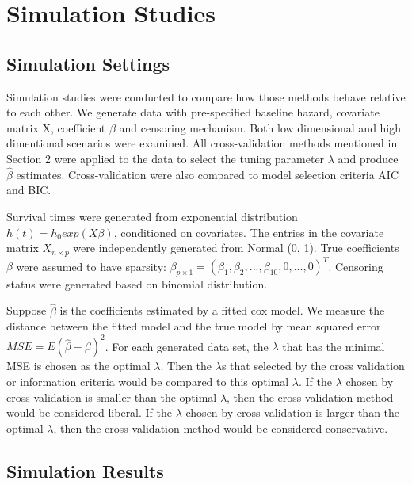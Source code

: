 \documentclass{article}\usepackage[]{graphicx}\usepackage[]{color}
\begin{document}
\section{Simulation Studies}

  \subsection{Simulation Settings}
  
  Simulation studies were conducted to compare how those methods behave relative to each other. We generate data with pre-specified baseline hazard, covariate matrix X, coefficient $\beta$ and censoring mechanism. Both low dimensional and high dimentional scenarios were examined. All cross-validation methods mentioned in Section 2 were applied to the data to select the tuning parameter $\lambda$ and produce $\hat{\beta}$ estimates. Cross-validation were also compared to model selection criteria AIC and BIC.
  
  Survival times were generated from exponential distribution $h(t) = h_{0} exp(X\beta)$, conditioned on covariates. The entries in the covariate matrix $X_{n \times p}$ were independently generated from Normal (0, 1). True coefficients $\beta$  were assumed to have sparsity: $\beta_{p\times 1} = (\beta_{1},\beta_{2}, ..., \beta_{10}, 0, ..., 0)^{T}$.  Censoring status were generated based on binomial distribution.
  
  Suppose $\hat{\beta}$ is the coefficients estimated by a fitted cox model. We measure the distance between the fitted model and the true model by mean squared error $MSE = E(\hat{\beta} - \beta)^2$. For each generated data set, the $\lambda$ that has the minimal MSE is chosen as the optimal $\lambda$. Then the $\lambda$s that selected by the cross validation or information criteria would be compared to this optimal $\lambda$. If the $\lambda$ chosen by cross validation is smaller than the optimal $\lambda$, then the cross validation method would be considered liberal. If the $\lambda$ chosen by cross validation is larger than the optimal $\lambda$, then the cross validation method would be considered conservative. 
  
  \subsection{Simulation Results}
	
\end{document}
